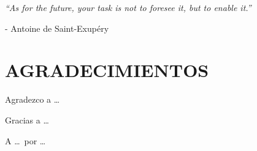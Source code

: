 \documentclass[a4paper, 11pt, spanish, twoside]{article}
\begin{document}
 


\newpage
\thispagestyle{empty}




\newpage
\thispagestyle{empty}

\begin{flushright} %
\vspace*{5cm} %

\textit{“As for the future, your task is not to foresee it, but to enable it.”} 

\medskip %
- Antoine de Saint-Exupéry

\end{flushright}

\afterpage{\blankpage} %


\newpage
\thispagestyle{plain} %

\section*{AGRADECIMIENTOS} %

Agradezco a \dots

Gracias a \dots

A \dots \ por \dots

\afterpage{\blankpage} %
\end{document}
